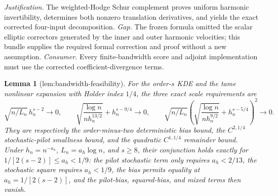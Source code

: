 \documentclass{article}
\newtheorem{lemma}{Lemma}
\begin{document}
\par\smallskip\noindent \textit{Justification.} The weighted-Hodge Schur complement proves uniform harmonic invertibility, determines both nonzero translation derivatives, and yields the exact corrected four-input decomposition. \textit{Gap.} The frozen formula omitted the scalar elliptic correctors generated by the inner and outer harmonic velocities; this bundle supplies the required formal correction and proof without a new assumption. \textit{Consumer.} Every finite-bandwidth score and adjoint implementation must use the corrected coefficient-divergence terms.

\begin{lemma}[lem:bandwidth-feasibility]\label{lem:bandwidth-feasibility}
For the order-\(s\) KDE and the tame nonlinear expansion with Holder index \(1/4\), the three exact scale requirements are \[\sqrt{n/L_n}\,h_n^{s-2}\to0,\qquad \sqrt{\frac{\log n}{n h_n^{13/2}}}+h_n^{s-9/4}\to0,\qquad \sqrt{n/L_n}\left(\sqrt{\frac{\log n}{n h_n^{9/2}}}+h_n^{s-5/4}\right)^2\to0.\] They are respectively the order-minus-two deterministic bias bound, the \(C^{2,1/4}\) stochastic-pilot smallness bound, and the quadratic \(C^{1,1/4}\) remainder bound. Under \(h_n=n^{-a_h}\), \(L_n=a_h\log n\), and \(s\geq8\), their conjunction holds exactly for \(1/[2(s-2)]\leq a_h<1/9\): the pilot stochastic term only requires \(a_h<2/13\), the stochastic square requires \(a_h<1/9\), the bias permits equality at \(a_h=1/[2(s-2)]\), and the pilot-bias, squared-bias, and mixed terms then vanish.
\end{lemma}
\end{document}
